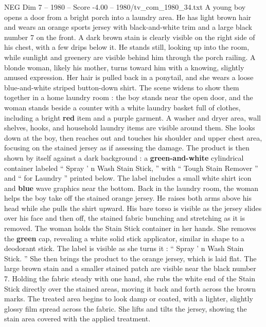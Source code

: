 \begin{textsample}{NEG Dim 7 – 1980 – Score -4.00 – 1980/tv\_com\_1980\_34.txt}  \label{ex:f7_neg_057}
A young boy opens a door from a bright porch into a laundry area.
He has light brown hair and wears an orange sports jersey with black-and-white trim and a large black number 7 on the front.
A dark brown stain is clearly visible on the right side of his chest, with a few drips below it.
He stands still, looking up into the room, while sunlight and greenery are visible behind him through the porch railing.
A blonde woman, likely his mother, turns toward him with a knowing, slightly amused expression.
Her hair is pulled back in a ponytail, and she wears a loose blue-and-white striped button-down shirt.
The scene widens to show them together in a home laundry room : the boy stands near the open door, and the woman stands beside a counter with a white laundry basket full of clothes, including a bright \textbf{red} item and a purple garment.
A washer and dryer area, wall shelves, hooks, and household laundry items are visible around them.
She looks down at the boy, then reaches out and touches his shoulder and upper chest area, focusing on the stained jersey as if assessing the damage.
The product is then shown by itself against a dark background : a \textbf{green-and-white} cylindrical container labeled “ Spray ’ n Wash Stain Stick, ” with “ Tough Stain Remover ” and “ for Laundry ” printed below.
The label includes a small white shirt icon and \textbf{blue} wave graphics near the bottom.
Back in the laundry room, the woman helps the boy take off the stained orange jersey.
He raises both arms above his head while she pulls the shirt upward.
His bare torso is visible as the jersey slides over his face and then off, the stained fabric bunching and stretching as it is removed.
The woman holds the Stain Stick container in her hands.
She removes the \textbf{green} cap, revealing a white solid stick applicator, similar in shape to a deodorant stick.
The label is visible as she turns it : “ Spray ’ n Wash Stain Stick. ” She then brings the product to the orange jersey, which is laid flat.
The large brown stain and a smaller stained patch are visible near the black number 7.
Holding the fabric steady with one hand, she rubs the white end of the Stain Stick directly over the stained areas, moving it back and forth across the brown marks.
The treated area begins to look damp or coated, with a lighter, slightly glossy film spread across the fabric.
She lifts and tilts the jersey, showing the stain area covered with the applied treatment.

\end{textsample}
